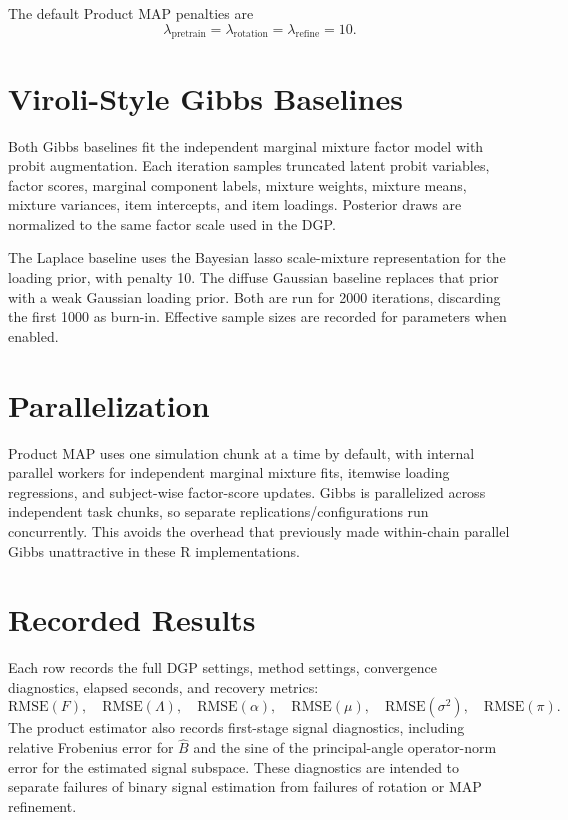 \documentclass[11pt]{article}
\begin{document}
The default Product MAP penalties are
\[
  \lambda_{\mathrm{pretrain}}=
  \lambda_{\mathrm{rotation}}=
  \lambda_{\mathrm{refine}}=10.
\]

\section{Viroli-Style Gibbs Baselines}

Both Gibbs baselines fit the independent marginal mixture factor model with
probit augmentation.  Each iteration samples truncated latent probit variables,
factor scores, marginal component labels, mixture weights, mixture means,
mixture variances, item intercepts, and item loadings.  Posterior draws are
normalized to the same factor scale used in the DGP.

The Laplace baseline uses the Bayesian lasso scale-mixture representation for
the loading prior, with penalty 10.  The diffuse Gaussian baseline replaces
that prior with a weak Gaussian loading prior.  Both are run for 2000
iterations, discarding the first 1000 as burn-in.  Effective sample sizes are
recorded for parameters when enabled.

\section{Parallelization}

Product MAP uses one simulation chunk at a time by default, with internal
parallel workers for independent marginal mixture fits, itemwise loading
regressions, and subject-wise factor-score updates.  Gibbs is parallelized
across independent task chunks, so separate replications/configurations run
concurrently.  This avoids the overhead that previously made within-chain
parallel Gibbs unattractive in these R implementations.

\section{Recorded Results}

Each row records the full DGP settings, method settings, convergence
diagnostics, elapsed seconds, and recovery metrics:
\[
  \mathrm{RMSE}(F),\quad
  \mathrm{RMSE}(\Lambda),\quad
  \mathrm{RMSE}(\alpha),\quad
  \mathrm{RMSE}(\mu),\quad
  \mathrm{RMSE}(\sigma^2),\quad
  \mathrm{RMSE}(\pi).
\]
The product estimator also records first-stage signal diagnostics, including
relative Frobenius error for $\widehat B$ and the sine of the principal-angle
operator-norm error for the estimated signal subspace.  These diagnostics are
intended to separate failures of binary signal estimation from failures of
rotation or MAP refinement.
\end{document}
